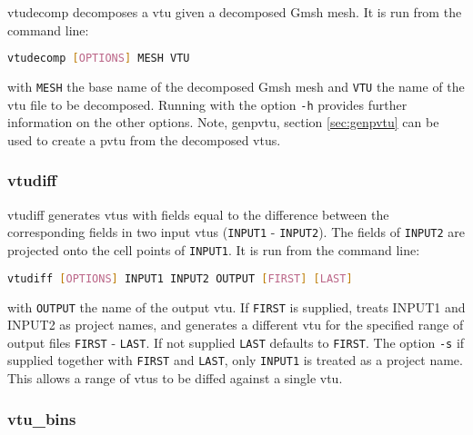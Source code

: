 vtudecomp decomposes a vtu given a decomposed Gmsh mesh. It is run from the command line:
\begin{lstlisting}[language = Bash]
vtudecomp [OPTIONS] MESH VTU
\end{lstlisting}
with \lstinline[language = Bash]+MESH+ the base name of the decomposed Gmsh mesh and \lstinline[language = Bash]+VTU+ the name of the vtu file to be decomposed. Running with the option \lstinline[language = Bash]+-h+ provides further information on the other options. Note, genpvtu, section \ref{sec:genpvtu} can be used to create a pvtu from the decomposed vtus.


\subsubsection{vtudiff}
\label{sec:vtudiff}

vtudiff generates vtus with fields equal to the difference between the corresponding fields in two input vtus (\lstinline[language = Bash]+INPUT1+ - \lstinline[language = Bash]+INPUT2+). The fields of \lstinline[language = Bash]+INPUT2+ are projected onto the cell points of \lstinline[language = Bash]+INPUT1+. It is run from the command line:
\begin{lstlisting}[language = Bash]
vtudiff [OPTIONS] INPUT1 INPUT2 OUTPUT [FIRST] [LAST]
\end{lstlisting}
with \lstinline[language = Bash]+OUTPUT+ the name of the output vtu. If \lstinline[language = Bash]+FIRST+ is supplied, treats INPUT1 and INPUT2 as project names, and generates a different vtu for the specified range of output files \lstinline[language = Bash]+FIRST+ - \lstinline[language = Bash]+LAST+. If not supplied \lstinline[language = Bash]+LAST+ defaults to \lstinline[language = Bash]+FIRST+. The option \lstinline[language = Bash]+-s+ if supplied together with \lstinline[language = Bash]+FIRST+ and \lstinline[language = Bash]+LAST+, only \lstinline[language = Bash]+INPUT1+ is treated as a project name. This allows a range of vtus to be diffed against a single vtu.


\subsubsection{vtu\_bins}
\label{sec:vtu_bins}

